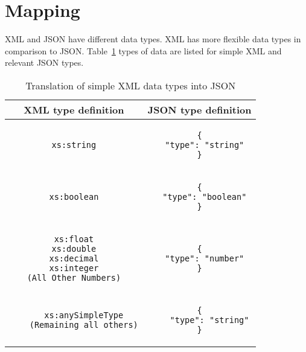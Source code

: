 \section{Mapping}
XML and JSON have different data types. XML has more flexible data types in comparison to JSON. Table~\ref{tbl:xml-json:types} types of data are listed for simple XML and relevant JSON types.
\begin{longtable}{c|c}
\caption{Translation of simple XML data types into JSON}
\label{tbl:xml-json:types}\\

\textbf{XML type definition} & \textbf{JSON type definition}\\
\hline

\begin{minipage}{.4\textwidth}
  \begin{lstlisting}
xs:string
  \end{lstlisting}
\end{minipage} &
\begin{minipage}{.4\textwidth}
\begin{lstlisting}
{
  "type": "string"
}
\end{lstlisting}
\end{minipage}\\

\hline
\begin{minipage}{.4\textwidth}
  \begin{lstlisting}
xs:boolean
  \end{lstlisting}
\end{minipage} &
\begin{minipage}{.4\textwidth}
\begin{lstlisting}
{
  "type": "boolean"
}
\end{lstlisting}
\end{minipage}\\

\hline
\begin{minipage}{.4\textwidth}
  \begin{lstlisting}
xs:float
xs:double
xs:decimal
xs:integer
(All Other Numbers)
  \end{lstlisting}
\end{minipage} &
\begin{minipage}{.4\textwidth}
\begin{lstlisting}
{
  "type": "number"
}
\end{lstlisting}
\end{minipage}\\
\hline

\begin{minipage}{.4\textwidth}
	\begin{lstlisting}
	xs:anySimpleType
	(Remaining all others)
	\end{lstlisting}
\end{minipage} &
\begin{minipage}{.4\textwidth}
\begin{lstlisting}
{
	"type": "string"
}
\end{lstlisting}
\end{minipage}\\
\end{longtable}

